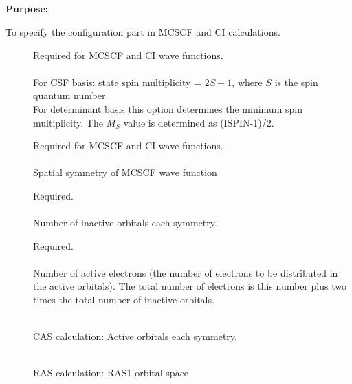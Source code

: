 \pagebreak[3]
\subsection{\label{ref-wavinp}}
 
{\bf Purpose:}
 
To specify the configuration part in MCSCF and CI calculations.
 
\begin{description}
\item[]
  Required for MCSCF and CI wave
  functions.\\
  \\
  For CSF basis: state spin multiplicity = $2S + 1$,
  where $S$ is the spin quantum number. \\
  For determinant basis this option determines the minimum spin
  multiplicity.  The $M_S$ value is determined as (ISPIN-1)/2.
 
\item[]
  Required for MCSCF and CI wave functions.\\
   \\
  Spatial symmetry of MCSCF wave function
 
\item[]
  Required.\\
   \\
  Number of inactive orbitals each symmetry.
 
\item[]
  Required.\\
   \\
  Number of active electrons (the number of
  electrons to be distributed 
  in the active orbitals).  The total number of electrons is this number
  plus two times the total number of inactive orbitals.
 
\item[]
   \\
  CAS calculation: Active orbitals each symmetry.
 
\item[]
    \\
   RAS calculation: RAS1 orbital space
 

\end{description}
